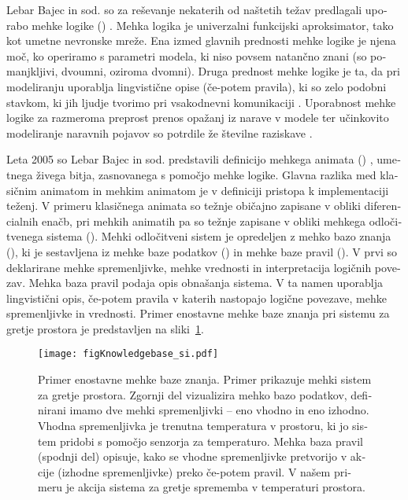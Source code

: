\begin{slovenian}
Lebar Bajec in sod. \cite{lebarbajec2005fuzzy,lebarbajec2005simulating} so za reševanje nekaterih od naštetih težav predlagali uporabo mehke logike () \cite{zadeh1965fuzzy}. Mehka logika je univerzalni funkcijski aproksimator, tako kot umetne nevronske mreže. Ena izmed glavnih prednosti mehke logike je njena moč, ko operiramo s parametri modela, ki niso povsem natančno znani (so pomanjkljivi, dvoumni, oziroma dvomni). Druga prednost mehke logike je ta, da pri modeliranju uporablja lingvistične opise (če-potem pravila), ki so zelo podobni stavkom, ki jih ljudje tvorimo pri vsakodnevni komunikaciji \cite{kosko1994fuzzy,lebarbajec2005fuzzy,lebarbajec2005simulating,mamdani1975experiment,mendel2001uncertain,zadeh1965fuzzy}. Uporabnost mehke logike za razmeroma preprost prenos opažanj iz narave v modele ter učinkovito modeliranje naravnih pojavov so potrdile že številne raziskave \cite{dasilva2008predator,demsar2013family,demsar2014simulated,demsar2016balanced,demsar2017evolution,lebarbajec2005fuzzy,lebarbajec2005simulating,tron2004mathematical}.

Leta 2005 so Lebar Bajec in sod. predstavili definicijo mehkega animata () \cite{lebarbajec2005fuzzy,lebarbajec2005simulating}, umetnega živega bitja, zasnovanega s pomočjo mehke logike. Glavna razlika med klasičnim animatom in mehkim animatom je v definiciji pristopa k implementaciji teženj. V primeru klasičnega animata so težnje običajno zapisane v obliki diferencialnih enačb, pri mehkih animatih pa so težnje zapisane v obliki mehkega odločitvenega sistema (). Mehki odločitveni sistem je opredeljen z mehko bazo znanja (), ki je sestavljena iz mehke baze podatkov () in mehke baze pravil (). V prvi so deklarirane mehke spremenljivke, mehke vrednosti in interpretacija logičnih povezav. Mehka baza pravil podaja opis obnašanja sistema. V ta namen uporablja lingvistični opis, če-potem pravila v katerih nastopajo logične povezave, mehke spremenljivke in vrednosti. Primer enostavne mehke baze znanja pri sistemu za gretje prostora je predstavljen na sliki~\ref{fig:knowledgebase_si}.

\begin{figure}
	\texttt{[image: figKnowledgebase\_si.pdf]}
	\caption{Primer enostavne mehke baze znanja. Primer prikazuje mehki sistem za gretje prostora. Zgornji del vizualizira mehko bazo podatkov, definirani imamo dve mehki spremenljivki -- eno vhodno in eno izhodno. Vhodna spremenljivka je trenutna temperatura v prostoru, ki jo sistem pridobi s pomočjo senzorja za temperaturo. Mehka baza pravil (spodnji del) opisuje, kako se vhodne spremenljivke pretvorijo v akcije (izhodne spremenljivke) preko če-potem pravil. V našem primeru je akcija sistema za gretje sprememba v temperaturi prostora.}
	\label{fig:knowledgebase_si}
\end{figure}


\end{slovenian}
